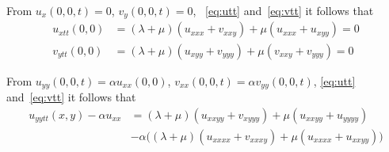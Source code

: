 \documentclass[11pt]{article}
\begin{document}
From $u_x(0,0,t)=0$, $v_y(0,0,t)=0$, ~\eqref{eq:utt} and~\eqref{eq:vtt} it follows that
\begin{align}
   u_{xtt}(0,0) &= (\lambda+\mu)(u_{xxx} + v_{xxy}) + \mu(u_{xxx} + u_{xyy}) =0 \\
   v_{ytt}(0,0) &= (\lambda+\mu)(u_{xyy} + v_{yyy}) + \mu(v_{xxy} + v_{yyy}) =0
\end{align}


From $u_{yy}(0,0,t)=\alpha u_{xx}(0,0)$, $v_{xx}(0,0,t) = \alpha v_{yy}(0,0,t)$,
\eqref{eq:utt} and~\eqref{eq:vtt} it follows that
\begin{align}
   u_{yytt}(x,y)-\alpha u_{xx} &= (\lambda+\mu)(u_{xxyy} + v_{xyyy}) + \mu(u_{xxyy} + u_{yyyy}) \\
               & -\alpha\Big( (\lambda+\mu)(u_{xxxx} + v_{xxxy}) + \mu(u_{xxxx} + u_{xxyy}) \Big) 
\end{align}


\vfill\eject


\end{document}
